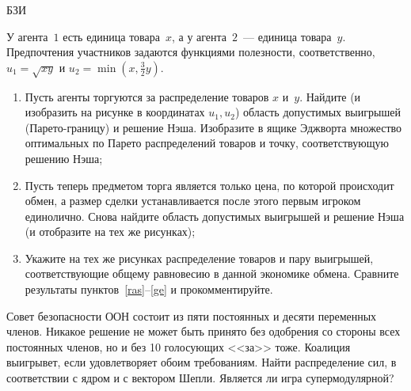 \begin{problem}
\begin{source}
БЗИ
\end{source}
 У агента~$1$ есть единица
товара~$x$, а у агента~$2$~--- единица товара~$y$.
Предпочтения участников задаются функциями полезности,
соответственно, $u_1=\sqrt{xy}$ и
$u_2=\min\left(x,\frac{3}{2}y\right)$.

\begin{enumerate}

\item\label{ras} Пусть агенты торгуются за распределение
товаров $x$ и~$y$. Найдите (и изобразить на рисунке в
координатах $u_1,u_2$) область допустимых выигрышей
(Парето-границу) и решение Нэша. Изобразите в ящике
Эджворта множество оптимальных по Парето распределений
товаров и точку, соответствующую решению Нэша;

\item\label{p} Пусть теперь предметом торга является только
цена, по которой происходит обмен, а размер сделки
устанавливается после этого первым игроком единолично.
Снова найдите область допустимых выигрышей и решение Нэша
(и отобразите на тех же рисунках);

\item\label{ge} Укажите на тех же рисунках распределение
товаров и пару выигрышей, соответствующие общему равновесию
в данной экономике обмена. Сравните результаты
пунктов~\ref{ras}--\ref{ge} и прокомментируйте.

\end{enumerate}


\begin{sol}

\end{sol}
\end{problem}

\begin{problem}
\begin{source}
\cite{savva:nmu}
\end{source}
Совет безопасности ООН состоит из пяти постоянных и десяти переменных членов. Никакое решение не может быть принято без одобрения со стороны всех постоянных членов, но и без 10 голосующих <<за>> тоже. Коалиция выигрывет, если удовлетворяет обоим требованиям. Найти распределение сил, в соответствии с ядром и с вектором Шепли. Является ли игра супермодулярной?


\begin{sol}

\end{sol}
\end{problem}




